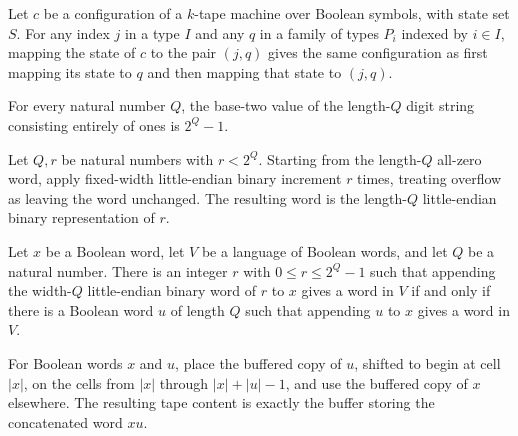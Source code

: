 \begin{theorem}
\label{Complexity.b2b_dispatch_retag}
\leanok
{}
Let $c$ be a configuration of a $k$-tape machine over Boolean symbols, with state set
$S$. For any index $j$ in a type $I$ and any $q$ in a family of types $P_i$ indexed by
$i\in I$, mapping the state of $c$ to the pair $(j,q)$ gives the same configuration as
first mapping its state to $q$ and then mapping that state to $(j,q)$.
\end{theorem}

\begin{theorem}
\label{Complexity.b2b_counter_value}
\leanok
{}
For every natural number $Q$, the base-two value of the length-$Q$ digit string
consisting entirely of ones is $2^Q-1$.
\end{theorem}

\begin{theorem}
\label{Complexity.b2b_certificate_orbit}
\leanok
{}
Let $Q,r$ be natural numbers with $r<2^Q$. Starting from the length-$Q$ all-zero word,
apply fixed-width little-endian binary increment $r$ times, treating overflow as leaving
the word unchanged. The resulting word is the length-$Q$ little-endian binary
representation of $r$.
\end{theorem}

\begin{theorem}
\label{Complexity.b2b_verifies_iff}
\leanok
{}
Let $x$ be a Boolean word, let $V$ be a language of Boolean words, and let $Q$ be a
natural number. There is an integer $r$ with $0\le r\le 2^Q-1$ such that appending the
width-$Q$ little-endian binary word of $r$ to $x$ gives a word in $V$ if and only if
there is a Boolean word $u$ of length $Q$ such that appending $u$ to $x$ gives a word in
$V$.
\end{theorem}

\begin{theorem}
\label{Complexity.b2b_buffer_concat}
\leanok
{}
For Boolean words $x$ and $u$, place the buffered copy of $u$, shifted to begin at cell
$|x|$, on the cells from $|x|$ through $|x|+|u|-1$, and use the buffered copy of $x$
elsewhere. The resulting tape content is exactly the buffer storing the concatenated
word $x u$.
\end{theorem}

